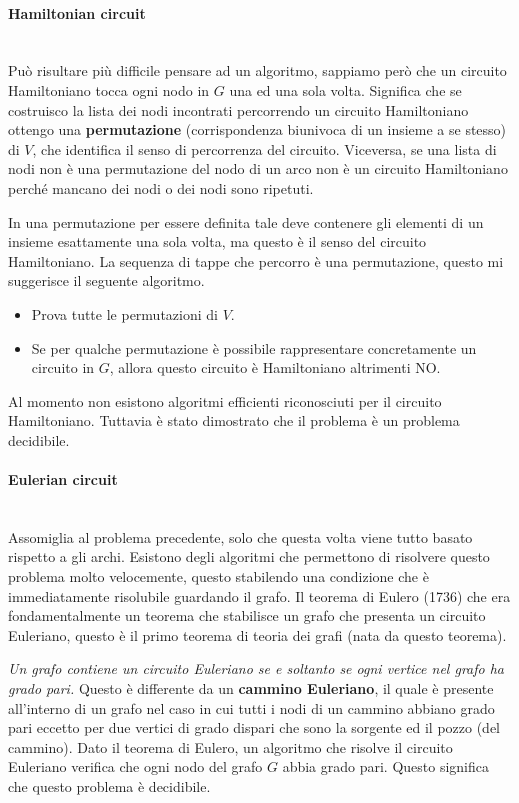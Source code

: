 \documentclass{article}
\begin{document}
\paragraph{Hamiltonian circuit}\mbox{}\\
Può risultare più difficile pensare ad un algoritmo, sappiamo però che un circuito
Hamiltoniano tocca ogni nodo in $G$ una ed una sola volta. Significa che
se costruisco la lista dei nodi incontrati percorrendo un circuito Hamiltoniano
ottengo una \textbf{permutazione} (corrispondenza biunivoca di un
insieme a se stesso) di $V$, che identifica il senso di percorrenza del circuito.
Viceversa, se una lista di nodi non è una permutazione
del nodo di un arco non è un circuito Hamiltoniano perché mancano dei nodi o
dei nodi sono ripetuti.

In una permutazione per essere definita tale deve contenere gli elementi di un
insieme esattamente una sola volta, ma questo è il senso del circuito Hamiltoniano.
La sequenza di tappe che percorro è una permutazione, questo mi suggerisce il seguente algoritmo.
\begin{itemize}
    \item Prova tutte le permutazioni di $V$.
    \item Se per qualche permutazione è possibile rappresentare concretamente
          un circuito in $G$, allora questo circuito è Hamiltoniano altrimenti NO.
\end{itemize}
Al momento non esistono algoritmi efficienti riconosciuti per il circuito Hamiltoniano.
Tuttavia è stato dimostrato che il problema è un problema decidibile.

\paragraph{Eulerian circuit}\mbox{}\\
Assomiglia al problema precedente, solo che questa volta viene tutto basato rispetto a gli archi.
Esistono degli algoritmi che permettono di risolvere questo problema molto velocemente,
questo stabilendo una condizione che è immediatamente risolubile guardando il grafo.
Il teorema di Eulero (1736) che era fondamentalmente un teorema che stabilisce un
grafo che presenta un circuito Euleriano, questo è il primo teorema di teoria dei grafi (nata
da questo teorema).

\textit{Un grafo contiene un circuito Euleriano se e soltanto se ogni vertice nel grafo ha grado
    pari.} Questo è differente da un \textbf{cammino Euleriano}, il quale è presente all'interno
di un grafo nel caso in cui tutti i nodi di un cammino abbiano grado pari eccetto per due
vertici di grado dispari che sono la sorgente ed il pozzo (del cammino). Dato il teorema di Eulero,
un algoritmo che risolve il circuito Euleriano verifica che ogni nodo del grafo $G$ abbia
grado pari. Questo significa che questo problema è decidibile.
\end{document}
